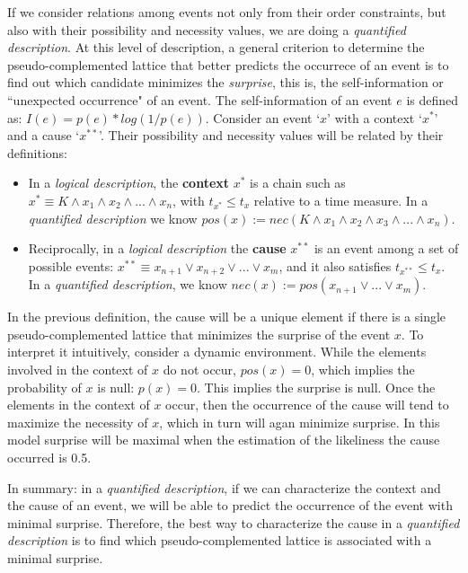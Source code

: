 \documentclass[
		twoside,openright,titlepage,numbers=noenddot,manychapters,
		headinclude,%
                footinclude=false,cleardoublepage=empty,
                BCOR=5mm,
		fontsize=11pt, %
                 enabledeprecatedfontcommands]{scrreprt}
\begin{document}
If we consider relations among events not only from their order constraints, but also with  their possibility and necessity values, we are doing a \emph{quantified description}. At this level of description, 
a general criterion to determine the pseudo-complemented lattice that better predicts the occurrece of an event is to find out which candidate minimizes the \emph{surprise}, this is, the self-information or ``unexpected occurrence" of an event.
The self-information of an event $e$ %
 is defined as: $I(e)= p(e)*log(1 / p(e))$. Consider an event `$x$' with a context `$x^*$' and a cause `$x^{**}$'. Their possibility and necessity values will be related by their definitions:


\begin{itemize}
 \item In a \emph{logical description}, the \textbf{context} $x^*$ is a chain such as $x^* \equiv K\wedge x_1 \wedge x_2 \wedge...\wedge x_n$, with $t_{x^*} \leq t_x$ relative to a time measure. In a \emph{quantified description} we know $pos(x):= nec(K \wedge x_1 \wedge x_2 \wedge x_3 \wedge ...\wedge x_n) $.

  \item  Reciprocally, in a \emph{logical description} the \textbf{cause} $x^{**}$ is an event among a set of possible events: $x^{**} \equiv x_{n+1} \vee x_{n+2} \vee ... \vee x_m $, and it  also satisfies $t_{x^{**}} \leq t_x$. In a \emph{quantified description}, we know $nec(x):= pos (x_{n+1} \vee ... \vee x_{m})$. 
\end{itemize}

In the previous definition, the cause will be a unique element if there is a single pseudo-complemented lattice that minimizes the surprise of the event $x$. To interpret it intuitively, consider a dynamic environment.  While the elements involved in the context of $x$ do not occur, $pos(x)= 0$, which implies the probability of $x$  is null: $p(x)=0$. This implies the surprise is null. Once the elements in the context of $x$ occur, then the occurrence of the cause will tend to maximize the necessity of $x$, which in turn will agan minimize surprise.  In this model surprise will be maximal when the estimation of the likeliness the cause occurred is 0.5. 

In summary: in a \emph{quantified description}, if we can characterize the context and the cause of an event, we will be able to predict the occurrence of the event with minimal surprise. Therefore, the best way to characterize the cause in a \emph{quantified description} is to find which pseudo-complemented lattice is associated with a minimal surprise.
\end{document}
